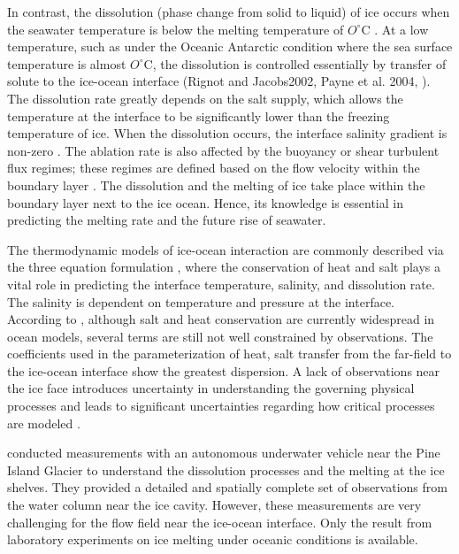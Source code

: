 \documentclass[11pt,a4paper]{article}
\begin{document}
    In contrast, the dissolution (phase change from solid to liquid) of ice occurs when the seawater temperature is below the melting temperature of $O^{\circ}$C \citep{mcphee1987dynamics, nicholls2012ocean, malyarenko2020synthesis}. At a low temperature, such as under the Oceanic Antarctic condition where the sea surface temperature is almost $O^{\circ}$C, the dissolution is controlled essentially by transfer of solute to the ice-ocean interface (Rignot and Jacobs2002, Payne et al. 2004, \cite{gayen2016simulation}). The dissolution rate greatly depends on the salt supply, which allows the temperature at the interface to be significantly lower than the freezing temperature of ice. When the dissolution occurs, the interface salinity gradient is non-zero \citep{kerr2015dissolution}. The ablation rate is also affected by the buoyancy or shear turbulent flux regimes; these regimes are defined based on the flow velocity within the boundary layer \citep{wells2008geophysical}. The dissolution and the melting of ice take place within the boundary layer next to the ice ocean. Hence, its knowledge is essential in predicting the melting rate and the future rise of seawater.
	
	The thermodynamic models of ice-ocean interaction are commonly described via the three equation formulation \citep{holland1999modeling}, where the conservation of heat and salt plays a vital role in predicting the interface temperature, salinity, and dissolution rate. The salinity is dependent on temperature and pressure at the interface. According to \cite{malyarenko2020synthesis}, although salt and heat conservation are currently widespread in ocean models, several terms are still not well constrained by observations. The coefficients used in the parameterization of heat, salt transfer from the far-field to the ice-ocean interface show the greatest dispersion. A lack of observations near the ice face introduces uncertainty in understanding the governing physical processes and leads to significant uncertainties regarding how critical processes are modeled \citep{malyarenko2020synthesis}.
	
	\cite{jenkins2010observations} conducted measurements with an autonomous underwater vehicle near the Pine Island Glacier to understand the dissolution processes and the melting at the ice shelves. They provided a detailed and spatially complete set of observations from the water column near the ice cavity. However, these measurements are very challenging for the flow field near the ice-ocean interface. Only the result from laboratory experiments on ice melting under oceanic conditions is available.
	
\end{document}
